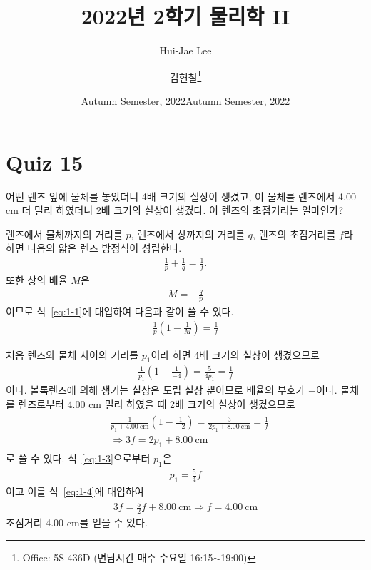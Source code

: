 \documentclass[tightenlines,floatfix,nofootinbib,superscriptaddress,fleqn]{revtex4}
\begin{document}
\title{\Large 2022년 2학기 물리학 II}
\author{Hui-Jae Lee} 
\date{Autumn Semester, 2022}
\author{김현철\footnote{Office: 5S-436D (면담시간 매주
    수요일-16:15$\sim$19:00)}} 
\date{Autumn Semester, 2022}
\maketitle


\section*{\large Quiz 15}
어떤 렌즈 앞에 물체를 놓았더니 4배 크기의 실상이 생겼고, 이 물체를
렌즈에서 4.00 cm 더 멀리 하였더니 2배 크기의 실상이 생겼다. 이 렌즈의
초점거리는 얼마인가? 

렌즈에서 물체까지의 거리를 $p$, 렌즈에서 상까지의 거리를 $q$, 렌즈의 초점거리를
$f$라 하면 다음의 얇은 렌즈 방정식이 성립한다.
\begin{align}\label{eq:1-1}
  \frac{1}{p}+\frac{1}{q}=\frac{1}{f}.
\end{align}
또한 상의 배율 $M$은
\begin{align}
  M = -\frac{q}{p}
\end{align}
이므로 식~\eqref{eq:1-1}에 대입하여 다음과 같이 쓸 수 있다.
\begin{align}
  \frac{1}{p}\left(1-\frac{1}{M}\right)=\frac{1}{f}
\end{align}

처음 렌즈와 물체 사이의 거리를 $p_1$이라 하면 4배 크기의 실상이 생겼으므로
\begin{align}\label{eq:1-3}
  \frac{1}{p_1}\left(1-\frac{1}{-4}\right)
  =\frac{5}{4p_1}=\frac{1}{f}
\end{align}
이다. 볼록렌즈에 의해 생기는 실상은 도립 실상 뿐이므로 배율의 부호가 $-$이다. 
물체를 렌즈로부터 4.00 cm 멀리 하였을 때 2배 크기의 실상이 생겼으므로
\begin{align}\label{eq:1-4}
  \begin{split}
    &\frac{1}{p_1+4.00~\mathrm{cm}}\left(1-\frac{1}{-2}\right)
    =\frac{3}{2p_1+8.00~\mathrm{cm}}=\frac{1}{f} \\
    &\Longrightarrow 3f= 2p_1+8.00~\mathrm{cm}
  \end{split}
\end{align}
로 쓸 수 있다. 식~\eqref{eq:1-3}으로부터 $p_1$은
\begin{align}
  p_1 = \frac{5}{4}f
\end{align}
이고 이를 식~\eqref{eq:1-4}에 대입하여
\begin{align}
  3f= \frac{5}{2}f+8.00~\mathrm{cm}
  \Longrightarrow
  f= 4.00~\mathrm{cm}
\end{align}
초점거리 4.00 cm를 얻을 수 있다.
\vspace{1cm}
\end{document}
